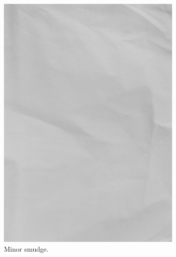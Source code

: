 \begin{figure}
    \centering
    \begin{subfigure}{0.3\textwidth}
        \includegraphics[width=\textwidth]{images/003.jpg}
        \caption{Minor smudge.}
    \end{subfigure}
    \begin{subfigure}{0.3\textwidth}

\end{subfigure}
\end{figure}
